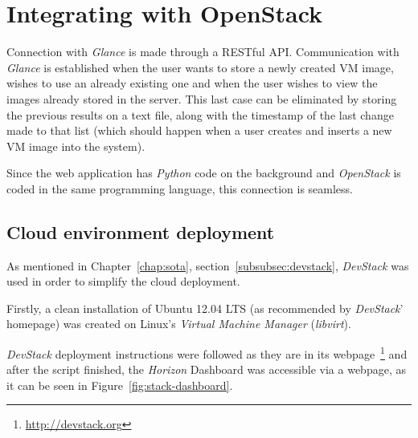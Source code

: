 \section{Integrating with OpenStack}

Connection with \textit{Glance} is made through a RESTful API. Communication with \textit{Glance} is established when the user wants to store a newly created VM image, wishes to use an already existing one and when the user wishes to view the images already stored in the server. This last case can be eliminated by storing the previous results on a text file, along with the timestamp of the last change made to that list (which should happen when a user creates and inserts a new VM image into the system).

Since the web application has \textit{Python} code on the background and \textit{OpenStack} is coded in the same programming language, this connection is seamless.


\subsection{Cloud environment deployment}\label{subsec:cloud_env}

As mentioned in Chapter~\ref{chap:sota}, section~\ref{subsubsec:devstack}, \textit{DevStack} was used in order to simplify the cloud deployment.

Firstly, a clean installation of Ubuntu 12.04 LTS (as recommended by \textit{DevStack}' homepage) was created on Linux's \textit{Virtual Machine Manager} (\textit{libvirt}).

\textit{DevStack} deployment instructions were followed as they are in its webpage~\footnote{\url{http://devstack.org}} and after the script finished, the \textit{Horizon} Dashboard was accessible via a webpage, as it can be seen in Figure~\ref{fig:stack-dashboard}.

